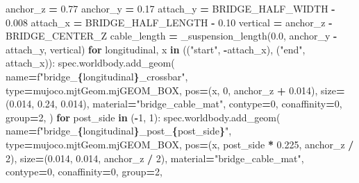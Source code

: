 \documentclass[
  american,
  11pt,
  letterpaper,
]{article}
\newenvironment{Shaded}{\begin{snugshade}}{\end{snugshade}}
\newcommand{\BuiltInTok}[1]{#1}
\newcommand{\ControlFlowTok}[1]{\textcolor[rgb]{0.13,0.29,0.53}{\textbf{#1}}}
\newcommand{\DecValTok}[1]{\textcolor[rgb]{0.00,0.00,0.81}{#1}}
\newcommand{\FloatTok}[1]{\textcolor[rgb]{0.00,0.00,0.81}{#1}}
\newcommand{\KeywordTok}[1]{\textcolor[rgb]{0.13,0.29,0.53}{\textbf{#1}}}
\newcommand{\NormalTok}[1]{#1}
\newcommand{\OperatorTok}[1]{\textcolor[rgb]{0.81,0.36,0.00}{\textbf{#1}}}
\newcommand{\SpecialCharTok}[1]{\textcolor[rgb]{0.81,0.36,0.00}{\textbf{#1}}}
\newcommand{\SpecialStringTok}[1]{\textcolor[rgb]{0.31,0.60,0.02}{#1}}
\newcommand{\StringTok}[1]{\textcolor[rgb]{0.31,0.60,0.02}{#1}}
\renewenvironment{Shaded}{\par\smallskip}{\par\smallskip}
\begin{document}
\begin{Shaded}
\begin{Highlighting}[]
\NormalTok{    anchor\_z }\OperatorTok{=} \FloatTok{0.77}
\NormalTok{    anchor\_y }\OperatorTok{=} \FloatTok{0.17}
\NormalTok{    attach\_y }\OperatorTok{=}\NormalTok{ BRIDGE\_HALF\_WIDTH }\OperatorTok{{-}} \FloatTok{0.008}
\NormalTok{    attach\_x }\OperatorTok{=}\NormalTok{ BRIDGE\_HALF\_LENGTH }\OperatorTok{{-}} \FloatTok{0.10}
\NormalTok{    vertical }\OperatorTok{=}\NormalTok{ anchor\_z }\OperatorTok{{-}}\NormalTok{ BRIDGE\_CENTER\_Z}
\NormalTok{    cable\_length }\OperatorTok{=}\NormalTok{ \_suspension\_length(}\FloatTok{0.0}\NormalTok{, anchor\_y }\OperatorTok{{-}}\NormalTok{ attach\_y, vertical)}
    \ControlFlowTok{for}\NormalTok{ longitudinal, x }\KeywordTok{in}\NormalTok{ ((}\StringTok{"start"}\NormalTok{, }\OperatorTok{{-}}\NormalTok{attach\_x), (}\StringTok{"end"}\NormalTok{, attach\_x)):}
\NormalTok{        spec.worldbody.add\_geom(}
\NormalTok{            name}\OperatorTok{=}\SpecialStringTok{f"bridge\_}\SpecialCharTok{\{}\NormalTok{longitudinal}\SpecialCharTok{\}}\SpecialStringTok{\_crossbar"}\NormalTok{, }\BuiltInTok{type}\OperatorTok{=}\NormalTok{mujoco.mjtGeom.mjGEOM\_BOX,}
\NormalTok{            pos}\OperatorTok{=}\NormalTok{(x, }\DecValTok{0}\NormalTok{, anchor\_z }\OperatorTok{+} \FloatTok{0.014}\NormalTok{), size}\OperatorTok{=}\NormalTok{(}\FloatTok{0.014}\NormalTok{, }\FloatTok{0.24}\NormalTok{, }\FloatTok{0.014}\NormalTok{),}
\NormalTok{            material}\OperatorTok{=}\StringTok{"bridge\_cable\_mat"}\NormalTok{, contype}\OperatorTok{=}\DecValTok{0}\NormalTok{, conaffinity}\OperatorTok{=}\DecValTok{0}\NormalTok{, group}\OperatorTok{=}\DecValTok{2}\NormalTok{,}
\NormalTok{        )}
        \ControlFlowTok{for}\NormalTok{ post\_side }\KeywordTok{in}\NormalTok{ (}\OperatorTok{{-}}\DecValTok{1}\NormalTok{, }\DecValTok{1}\NormalTok{):}
\NormalTok{            spec.worldbody.add\_geom(}
\NormalTok{                name}\OperatorTok{=}\SpecialStringTok{f"bridge\_}\SpecialCharTok{\{}\NormalTok{longitudinal}\SpecialCharTok{\}}\SpecialStringTok{\_post\_}\SpecialCharTok{\{}\NormalTok{post\_side}\SpecialCharTok{\}}\SpecialStringTok{"}\NormalTok{, }\BuiltInTok{type}\OperatorTok{=}\NormalTok{mujoco.mjtGeom.mjGEOM\_BOX,}
\NormalTok{                pos}\OperatorTok{=}\NormalTok{(x, post\_side }\OperatorTok{*} \FloatTok{0.225}\NormalTok{, anchor\_z }\OperatorTok{/} \DecValTok{2}\NormalTok{),}
\NormalTok{                size}\OperatorTok{=}\NormalTok{(}\FloatTok{0.014}\NormalTok{, }\FloatTok{0.014}\NormalTok{, anchor\_z }\OperatorTok{/} \DecValTok{2}\NormalTok{), material}\OperatorTok{=}\StringTok{"bridge\_cable\_mat"}\NormalTok{,}
\NormalTok{                contype}\OperatorTok{=}\DecValTok{0}\NormalTok{, conaffinity}\OperatorTok{=}\DecValTok{0}\NormalTok{, group}\OperatorTok{=}\DecValTok{2}\NormalTok{,}

\end{Highlighting}
\end{Shaded}
\end{document}
